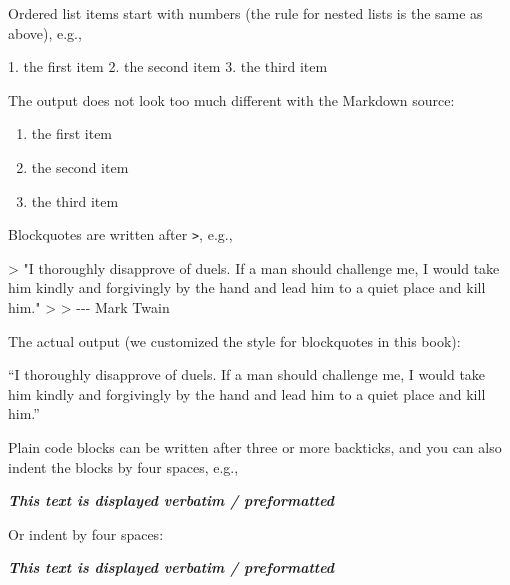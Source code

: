 \documentclass[
  12pt,
]{krantz}
\newenvironment{Shaded}{\begin{snugshade}}{\end{snugshade}}
\newcommand{\AttributeTok}[1]{\textcolor[rgb]{0.13,0.29,0.53}{#1}}
\newcommand{\InformationTok}[1]{\textcolor[rgb]{0.56,0.35,0.01}{\textbf{\textit{#1}}}}
\newcommand{\NormalTok}[1]{#1}
\newcommand{\SpecialStringTok}[1]{\textcolor[rgb]{0.31,0.60,0.02}{#1}}
\providecommand{\tightlist}{%
  \setlength{\itemsep}{0pt}\setlength{\parskip}{0pt}}
\renewenvironment{quote}{\begin{VF}}{\end{VF}}
\theoremstyle{definition}
\theoremstyle{definition}
\theoremstyle{definition}
\theoremstyle{definition}
\theoremstyle{remark}
\begin{document}
Ordered list items start with numbers (the rule for nested lists is the same as above), e.g.,

\begin{Shaded}
\begin{Highlighting}[]
\SpecialStringTok{1. }\NormalTok{the first item}
\SpecialStringTok{2. }\NormalTok{the second item}
\SpecialStringTok{3. }\NormalTok{the third item}
\end{Highlighting}
\end{Shaded}

The output does not look too much different with the Markdown source:

\begin{enumerate}
\def\labelenumi{\arabic{enumi}.}
\tightlist
\item
  the first item
\item
  the second item
\item
  the third item
\end{enumerate}

Blockquotes are written after \texttt{\textgreater{}}, e.g.,

\begin{Shaded}
\begin{Highlighting}[]
\AttributeTok{\textgreater{} "I thoroughly disapprove of duels. If a man should challenge me,}
\AttributeTok{  I would take him kindly and forgivingly by the hand and lead him}
\AttributeTok{  to a quiet place and kill him."}
\AttributeTok{\textgreater{}}
\AttributeTok{\textgreater{} {-}{-}{-} Mark Twain}
\end{Highlighting}
\end{Shaded}

The actual output (we customized the style for blockquotes in this book):

\begin{quote}
``I thoroughly disapprove of duels. If a man should challenge me,
I would take him kindly and forgivingly by the hand and lead him
to a quiet place and kill him.''

\end{quote}

Plain code blocks can be written after three or more backticks, and you can also indent the blocks by four spaces, e.g.,

\begin{Shaded}
\begin{Highlighting}[]
\InformationTok{\textasciigrave{}\textasciigrave{}\textasciigrave{}}
\InformationTok{This text is displayed verbatim / preformatted}
\InformationTok{\textasciigrave{}\textasciigrave{}\textasciigrave{}}

\NormalTok{Or indent by four spaces:}

\InformationTok{    This text is displayed verbatim / preformatted}
\end{Highlighting}
\end{Shaded}
\end{document}
